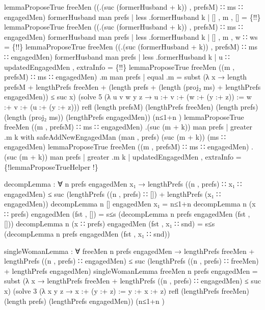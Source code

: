 \documentclass{article}
\begin{document}
\begin{code}
{lemmaProposeTrue freeMen ((.(suc (formerHusband + k)) , prefsM) ∷ ms ∷ engagedMen) formerHusband man prefs | less .formerHusband k | [] , m , [] = \{!!\}
lemmaProposeTrue freeMen ((.(suc (formerHusband + k)) , prefsM) ∷ ms ∷ engagedMen) formerHusband man prefs | less .formerHusband k | [] , m , w ∷ ws = \{!!\}
lemmaProposeTrue freeMen ((.(suc (formerHusband + k)) , prefsM) ∷ ms ∷ engagedMen) formerHusband man prefs | less .formerHusband k | u ∷ updatedEngagedMen , extraInfo = \{!!\}
lemmaProposeTrue freeMen ((m , prefsM) ∷ ms ∷ engagedMen) .m man prefs | equal .m = subst (λ x → length prefsM + lengthPrefs freeMen + (length prefs + (length (proj₂ ms) + lengthPrefs engagedMen)) ≤ suc x)
                                                                                           (solve 5 (λ u v w y z → u :+ v :+ (w :+ (y :+ z)) := w :+ v :+ (u :+ (y :+ z))) refl
                                                                                                  (length prefsM) (lengthPrefs freeMen) (length prefs) (length (proj₂ ms)) (lengthPrefs engagedMen))
                                                                                           (n≤1+n \AgdaUnderscore{})
lemmaProposeTrue freeMen ((m , prefsM) ∷ ms ∷ engagedMen) .(suc (m + k)) man prefs | greater .m k with safeAddNewEngagedMan (man , prefs) (suc (m + k)) (ms ∷ engagedMen)
lemmaProposeTrue freeMen ((m , prefsM) ∷ ms ∷ engagedMen) .(suc (m + k)) man prefs | greater .m k | updatedEngagedMen , extraInfo = \{!lemmaProposeTrueHelper !\}

decompLemma : ∀ n prefs engagedMen x₁ → lengthPrefs ((n , prefs) ∷ x₁ ∷ engagedMen) ≤ suc (lengthPrefs ((n , prefs) ∷ []) + lengthPrefs (x₁ ∷ engagedMen))
decompLemma n [] engagedMen x₁ = n≤1+n \AgdaUnderscore{}
decompLemma n (x ∷ prefs) engagedMen (fst , []) = s≤s (decompLemma n prefs engagedMen (fst , []))
decompLemma n (x ∷ prefs) engagedMen (fst , x₁ ∷ snd) = s≤s (decompLemma n prefs engagedMen (fst , x₁ ∷ snd))

singleWomanLemma : ∀ freeMen n prefs engagedMen →
  lengthPrefs freeMen + lengthPrefs ((n , prefs) ∷ engagedMen) ≤
  suc (lengthPrefs ((n , prefs) ∷ freeMen) + lengthPrefs engagedMen)
singleWomanLemma freeMen n prefs engagedMen = subst (λ x → lengthPrefs freeMen + lengthPrefs ((n , prefs) ∷ engagedMen) ≤ suc x)
                                                (solve 3 (λ x y z → x :+ (y :+ z) := y :+ x :+ z) refl (lengthPrefs freeMen) (length prefs) (lengthPrefs engagedMen))
                                                (n≤1+n \AgdaUnderscore{})

}
\end{code}
\end{document}
